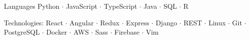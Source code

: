 


\begin{cvskills}

\cvskill
  {Languages } %
  {Python $\cdot$ JavaScript $\cdot$ TypeScript $\cdot$ Java $\cdot$ SQL $\cdot$ R } %




\cvskill
  {Technologies:} %
  {React $\cdot$ Angular $\cdot$ Redux $\cdot$ Express $\cdot$ Django $\cdot$ REST $\cdot$ Linux $\cdot$ Git $\cdot$ PostgreSQL $\cdot$ Docker $\cdot$ AWS $\cdot$ Sass $\cdot$ Firebase $\cdot$ Vim } %





\end{cvskills}
